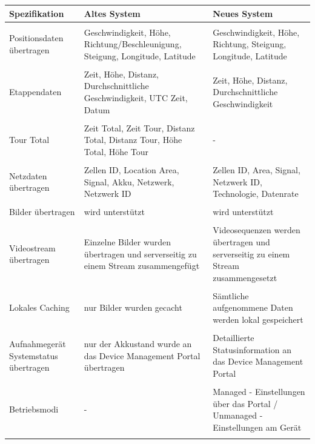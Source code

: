 \begin{longtable}{  p{3.5cm} | p{4.3cm} | p{4.3cm} }
    
    \textbf{Spezifikation} & \textbf{Altes System} & \textbf{Neues System} \\ [1ex] \hline \hline & &  \\ [-1.5ex]
    Positionsdaten übertragen & Geschwindigkeit, H\"{o}he, Richtung/Beschleunigung, Steigung, Longitude, Latitude & Geschwindigkeit, H\"{o}he, Richtung, Steigung, Longitude, Latitude \\ [1ex] \hline & &  \\ [-1.5ex]
    Etappendaten & Zeit, Höhe, Distanz, Durchschnittliche Geschwindigkeit, UTC Zeit, Datum & Zeit, Höhe, Distanz, Durchschnittliche Geschwindigkeit \\ [1ex] \hline & &  \\ [-1.5ex]
     Tour Total & Zeit Total, Zeit Tour, Distanz Total, Distanz Tour, Höhe Total, H\"{o}he Tour & - \\ [1ex] \hline & &  \\ [-1.5ex]
    Netzdaten übertragen & Zellen ID, Location Area, Signal, Akku, Netzwerk, Netzwerk ID & Zellen ID, Area, Signal, Netzwerk ID, Technologie, Datenrate\\ [1ex] \hline & &  \\ [-1.5ex]
    Bilder \"{u}bertragen & wird unterstützt & wird unterstützt \\ [1ex] \hline & &  \\ [-1.5ex]
    Videostream \"{u}bertragen & Einzelne Bilder wurden \"{u}bertragen und serverseitig zu einem Stream zusammengef\"{u}gt & Videosequenzen werden \"{u}bertragen und serverseitig zu einem Stream zusammengesetzt\\ [1ex] \hline & &  \\ [-1.5ex]
    Lokales Caching & nur Bilder wurden gecacht & S\"{a}mtliche aufgenommene Daten werden lokal gespeichert\\ [1ex] \hline & &  \\ [-1.5ex]
	Aufnahmegerät Systemstatus \"{u}bertragen & nur der Akkustand wurde an das Device Management Portal \"{u}bertragen & Detaillierte Statusinformation an das Device Management Portal\\ [1ex] \hline & &  \\ [-1.5ex]   
    Betriebsmodi & - & Managed - Einstellungen \"{u}ber das Portal / Unmanaged - Einstellungen am Ger\"{a}t\\ [1ex] \hline & &  \\ [-1.5ex]

\end{longtable}
